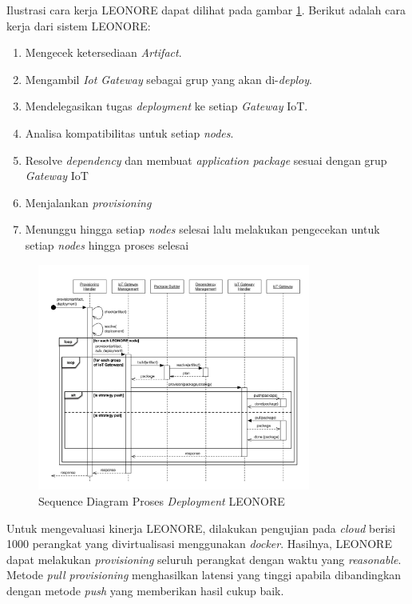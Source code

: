 Ilustrasi cara kerja LEONORE dapat dilihat pada gambar \ref{fig:sequence-leonore}. Berikut adalah cara kerja dari sistem LEONORE:
\begin{enumerate}
  \item Mengecek ketersediaan \textit{Artifact}.
  \item Mengambil \textit{Iot Gateway} sebagai grup yang akan di-\textit{deploy}.
  \item Mendelegasikan tugas \textit{deployment} ke setiap \textit{Gateway} IoT.
  \item Analisa kompatibilitas untuk setiap \textit{nodes}.
  \item Resolve \textit{dependency} dan membuat \textit{application package} sesuai dengan grup \textit{Gateway} IoT
  \item Menjalankan \textit{provisioning}
  \item Menunggu hingga setiap \textit{nodes} selesai lalu melakukan pengecekan untuk setiap \textit{nodes} hingga proses selesai
\end{enumerate}

\begin{figure}[ht]
  \centering
  \includegraphics[width=0.8\textwidth]{resources/chapter-2/leonore-sequence.jpg}
  \caption{Sequence Diagram Proses \textit{Deployment} LEONORE \parencite{vogler2015leonore}}
  \label{fig:sequence-leonore}
\end{figure}

Untuk mengevaluasi kinerja LEONORE, dilakukan pengujian pada \textit{cloud} berisi 1000 perangkat yang divirtualisasi menggunakan \textit{docker}. Hasilnya, LEONORE dapat melakukan \textit{provisioning} seluruh perangkat dengan waktu yang \textit{reasonable}. Metode \textit{pull provisioning} menghasilkan latensi yang tinggi apabila dibandingkan dengan metode \textit{push} yang memberikan hasil cukup baik.